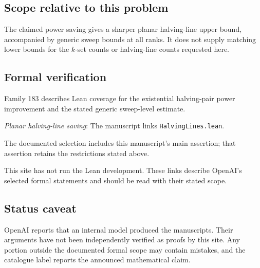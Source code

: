 \documentclass[11pt]{article}
\begin{document}
\subsection{Scope relative to this problem}
The claimed power saving gives a sharper planar halving-line upper bound, accompanied by generic sweep bounds at all ranks. It does not supply matching lower bounds for the $k$-set counts or halving-line counts requested here.

\subsection{Formal verification}
Family 183 describes Lean coverage for the existential halving-pair power improvement and the stated generic sweep-level estimate.

\textit{Planar halving-line saving}: The manuscript links \texttt{HalvingLines.lean}.

The documented selection includes this manuscript’s main assertion; that assertion retains the restrictions stated above.

This site has not run the Lean development. These links describe OpenAI’s selected formal statements and should be read with their stated scope.

\subsection{Status caveat}
OpenAI reports that an internal model produced the manuscripts. Their arguments have not been independently verified as proofs by this site. Any portion outside the documented formal scope may contain mistakes, and the catalogue label reports the announced mathematical claim.
\end{document}
